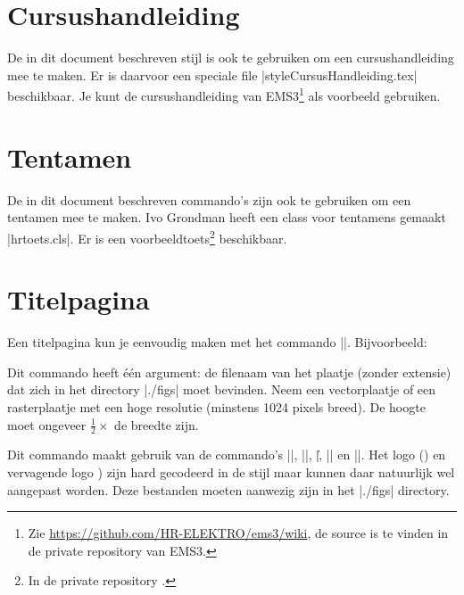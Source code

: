 \section{Cursushandleiding}
De in dit document beschreven stijl is ook te gebruiken om een cursushandleiding mee te maken. Er is daarvoor een speciale file |styleCursusHandleiding.tex| beschikbaar. Je kunt de cursushandleiding van EMS3\footnote{%
	Zie \url{https://github.com/HR-ELEKTRO/ems3/wiki}, de source is te vinden in de private repository van EMS3. 
} als voorbeeld gebruiken.

\section{Tentamen}
De in dit document beschreven commando's zijn ook te gebruiken om een tentamen mee te maken. Ivo Grondman heeft een class voor tentamens gemaakt |hrtoets.cls|. Er is een voorbeeldtoets\footnote{%
	In de private repository . 
}  beschikbaar.

\section{Titelpagina}
Een titelpagina kun je eenvoudig maken met het commando |\titelpagina|.
Bijvoorbeeld:

Dit commando heeft één argument: de filenaam van het plaatje (zonder extensie) dat zich in het directory |./figs| moet bevinden.
Neem een vectorplaatje of een rasterplaatje met een hoge resolutie (minstens 1024 pixels breed).
De hoogte moet ongeveer $\frac{1}{2}\times$ de breedte zijn.

Dit commando maakt gebruik van de commando's |\modulecode|, |\titel|, |\|{\lstlcs{}}, |\huidigeversie| en |\auteurs|.
Het logo () en vervagende logo ) zijn hard gecodeerd in de stijl maar kunnen daar natuurlijk wel aangepast worden.
Deze bestanden moeten aanwezig zijn in het |./figs| directory.

